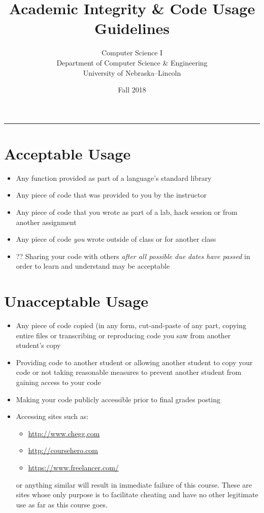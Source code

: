 \documentclass[12pt]{scrartcl}
\title{Academic Integrity \& Code Usage Guidelines}\let\Title\@title
\subtitle{Computer Science I\\
{\small
\vskip1cm
Department of Computer Science \& Engineering \\
University of Nebraska--Lincoln}
\vskip-1cm}
\date{Fall 2018}
\begin{document}
\maketitle

\hrule


\section*{Acceptable Usage}

\begin{itemize}
  \item Any function provided as part of a language's standard library
  \item Any piece of code that was provided to you by the instructor
  \item Any piece of code that you wrote as part of a lab, hack session or from another assignment
  \item Any piece of code \emph{you} wrote outside of class or for another class
  \item ?? Sharing your code with others \emph{after all possible due dates have passed} in order to learn and understand may be acceptable
\end{itemize}

\section*{Unacceptable Usage}

\begin{itemize}
  \item Any piece of code copied (in any form, cut-and-paste of any part, copying entire files or transcribing or reproducing code you saw from another student's copy
  \item Providing code to another student or allowing another student to copy your code or not taking reasonable measures to prevent another student from gaining access to your code
  \item Making your code publicly accessible prior to final grades posting
  \item Accessing sites such as:
  \begin{itemize}
    \item \url{http://www.chegg.com}
    \item \url{http://coursehero.com}
    \item \url{https://www.freelancer.com/} 
  \end{itemize}
  or anything similar will result in immediate failure of this course.  These
  are sites whose only purpose is to facilitate cheating and have no other 
  legitimate use as far as this course goes.
\end{itemize}
\end{document}
